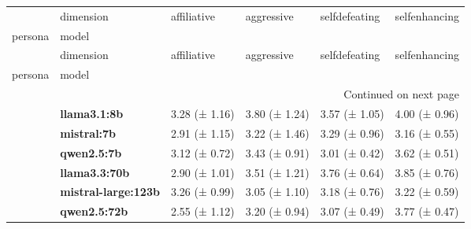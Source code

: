 \begin{longtable}{llllll}
\toprule
 & dimension & affiliative & aggressive & selfdefeating & selfenhancing \\
persona & model &  &  &  &  \\
\midrule
\endfirsthead
\toprule
 & dimension & affiliative & aggressive & selfdefeating & selfenhancing \\
persona & model &  &  &  &  \\
\midrule
\endhead
\midrule
\multicolumn{6}{r}{Continued on next page} \\
\midrule
\endfoot
\bottomrule
\endlastfoot
\multirow[t]{6}{*}{\textbf{base}} & \textbf{llama3.1:8b} & 3.28 (± 1.16) & 3.80 (± 1.24) & 3.57 (± 1.05) & 4.00 (± 0.96) \\
\textbf{} & \textbf{mistral:7b} & 2.91 (± 1.15) & 3.22 (± 1.46) & 3.29 (± 0.96) & 3.16 (± 0.55) \\
\textbf{} & \textbf{qwen2.5:7b} & 3.12 (± 0.72) & 3.43 (± 0.91) & 3.01 (± 0.42) & 3.62 (± 0.51) \\
\textbf{} & \textbf{llama3.3:70b} & 2.90 (± 1.01) & 3.51 (± 1.21) & 3.76 (± 0.64) & 3.85 (± 0.76) \\
\textbf{} & \textbf{mistral-large:123b} & 3.26 (± 0.99) & 3.05 (± 1.10) & 3.18 (± 0.76) & 3.22 (± 0.59) \\
\textbf{} & \textbf{qwen2.5:72b} & 2.55 (± 1.12) & 3.20 (± 0.94) & 3.07 (± 0.49) & 3.77 (± 0.47) \\
\cline{1-6}
\end{longtable}
